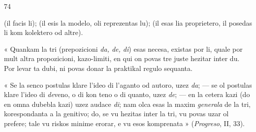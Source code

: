\begin{VUpage}[78]{74}

\cc
{}\cc
{} (il facis li);  (il esis\nl
la modelo, oli reprezentas lu);  (il\nl
esas lia proprietero, il posedas li kom kolektero od altre).

« Quankam la tri (prepozicioni \textit{da, de, di}) esas necesa,\nl
existas por li, quale por mult altra propozicioni, kazo-limiti,\nl
en qui on povas tre juste hezitar inter du. Por levar ta dubi,\nl
ni povas donar la praktikal regulo sequanta.

« Se la senco postulas klare l'ideo di l'aganto od autoro,\nl
uzez \textit{da}; --- se ol postulas klare l'ideo di \textit{de}veno, o di kon\cc
teno o di quanto, uzez \textit{de}; --- en la cetera kazi (do en omna\nl
dubebla kazi) uzez audace \textit{di}; nam olca esas la maxim\nl
\textit{generala} de la tri, korespondanta a la genitivo; do, se vu\nl
hezitas inter la tri, vu povas uzar ol prefere; tale vu riskos\nl
minime erorar, e vu esos komprenata » (\textit{Progreso}, II, 33).


\end{VUpage}
